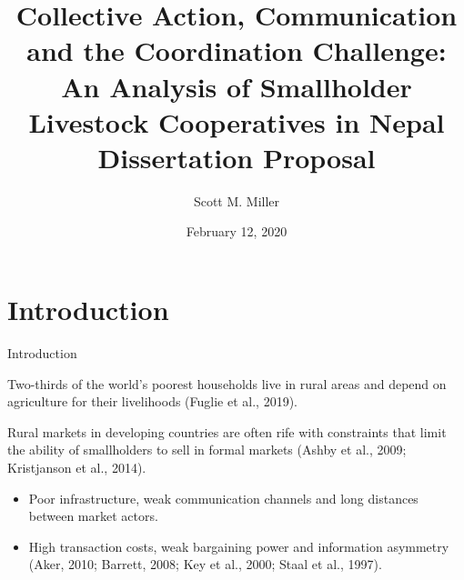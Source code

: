\documentclass[aspectratio=169]{beamer}
\title[Short title]{Collective Action, Communication and the Coordination Challenge:
An Analysis of Smallholder Livestock Cooperatives in Nepal \\
{\small Dissertation Proposal}} %
\author{Scott M. Miller} %
\institute[Food and Resource Economics Department, University of Florida] %
{
Food and Resource Economics Department \\ University of Florida\\ %
\medskip
}
\date{February 12, 2020} %
\newenvironment{wideitemize}{\itemize\addtolength{\itemsep}{10pt}}{\enditemize}
\begin{document}
\begin{frame}
\titlepage %
\end{frame}




\section{Introduction}

\begin{frame}{Introduction}
    \begin{wideitemize}
        \item Two-thirds of the world’s poorest households live in rural areas and depend on agriculture for their livelihoods (Fuglie et al., 2019). 
        \item Rural markets in developing countries are often rife with constraints that limit the ability of smallholders to sell in formal markets (Ashby et al., 2009; Kristjanson et al., 2014). \vspace{.25cm}
            \begin{itemize}
                \item Poor infrastructure, weak communication channels and long distances between market actors. \vspace{.25cm}
                \item High transaction costs, weak bargaining power and information asymmetry (Aker, 2010; Barrett, 2008; Key et al., 2000; Staal et al., 1997).
            \end{itemize}
    \end{wideitemize}
\end{frame}
\end{document}
